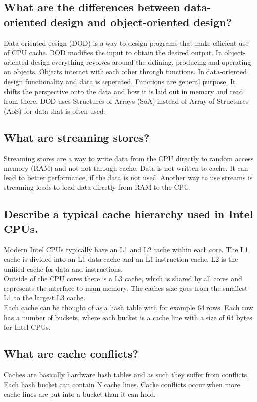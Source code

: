 \documentclass[runningheads]{llncs}
\begin{document}
\subsection{What are the differences between data-oriented design and object-oriented design?}
Data-oriented design (DOD) is a way to design programs that make efficient use of CPU cache. 
DOD modifies the input to obtain the desired output.
In object-oriented design everything revolves around the defining, producing and operating on objects.
Objects interact with each other through functions.
In data-oriented design functionality and data is seperated. Functions are general purpose,
It shifts the perspective onto the data and how it is laid out in memory and read from there.
DOD uses Structures of Arrays (SoA) instead of Array of Structures (AoS) for data that is often used.

\subsection{What are streaming stores?}
Streaming stores are a way to write data from the CPU directly to random access memory (RAM) and not not through cache.
Data is not written to cache.
It can lead to better performance, if the data is not used.
Another way to use streams is streaming loads to load data directly from RAM to the CPU.

\subsection{Describe a typical cache hierarchy used in Intel CPUs.}
Modern Intel CPUs typically have an L1 and L2 cache within each core. 
The L1 cache is divided into an L1 data cache and an L1 instruction cache.
L2 is the unified cache for data and instructions. \\
Outside of the CPU cores there is a L3 cache, which is shared by all cores and represents the interface to main memory.
The caches size goes from the smallest L1 to the largest L3 cache.
\\
Each cache can be thought of as a hash table with for example 64 rows. Each row has a number of buckets,
where each bucket is a cache line with a size of 64 bytes for Intel CPUs.


\subsection{What are cache conflicts?}
Caches are basically hardware hash tables and as such they suffer from conflicts.
Each hash bucket can contain N cache lines.
Cache conflicts occur when more cache lines are put into a bucket than it can hold.
\end{document}
